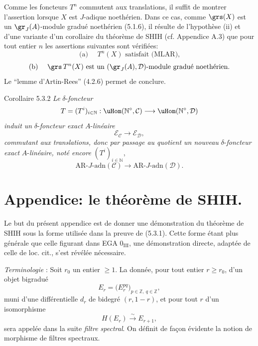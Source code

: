 \begin{prooftext}[Preuve]
Comme les foncteurs \(T^n\) commutent aux translations, il suffit de montrer l'assertion lorsque \(X\) est \(J\)-adique noethérien. Dans ce cas, comme \(\grs(X)\) est un \(\gr_J(A)\)-module gradué noethérien (5.1.6), il résulte de l'hypothèse (ii) et d'une variante d'un corollaire du théorème de SHIH (cf. Appendice A.3) que pour tout entier \(n\) les assertions suivantes sont vérifiées:
\[
\text{(a) }\quad T^n(X)\text{ satisfait (MLAR),}
\]
\[
\text{(b) }\quad \grs\,T^n(X)\text{ est un }(\gr_J(A),\mathcal{D})\text{-module gradué noethérien.}
\]
Le ``lemme d'Artin-Rees'' (4.2.6) permet de conclure.
\end{prooftext}

\begin{statement}{Corollaire 5.3.2}
\emph{Le} \(\delta\)-\emph{foncteur}
\[
T=(T^i)_{i\in\mathbb{N}}:\uHom(\mathbb{N}^\circ,\mathcal{C})\longrightarrow\uHom(\mathbb{N}^\circ,\mathcal{D})
\]
\emph{induit un} \(\delta\)-\emph{foncteur exact} \(A\)-\emph{linéaire}
\[
\mathcal{E}_{\mathcal{C}}\longrightarrow\mathcal{E}_{\mathcal{D}},
\]
\emph{commutant aux translations, donc par passage au quotient un nouveau} \(\delta\)-\emph{foncteur exact} \(A\)-\emph{linéaire, noté encore} \((T^i)_{i\in\mathbb{N}}\),
\[
\mathrm{AR}\text{-}J\text{-adn}(\mathcal{C})\longrightarrow
\mathrm{AR}\text{-}J\text{-adn}(\mathcal{D}).
\]
\end{statement}

\section*{Appendice: le théorème de SHIH.}

Le but du présent appendice est de donner une démonstration du théorème de SHIH sous la forme utilisée dans la preuve de (5.3.1). Cette forme étant plus générale que celle figurant dans EGA \(0_{\mathrm{III}}\), une démonstration directe, adaptée de celle de loc. cit., s'est révélée nécessaire.

\emph{Terminologie} : Soit \(r_0\) un entier \(\ge1\). La donnée, pour tout entier \(r\ge r_0\), d'un objet bigradué
\[
E_r=\bigl(E_r^{pq}\bigr)_{p\in\mathbb{Z},\ q\in\mathbb{Z}},
\]
muni d'une différentielle \(d_r\) de bidegré \((r,1-r)\), et pour tout \(r\) d'un isomorphisme
\[
H(E_r)\xrightarrow{\sim}E_{r+1},
\]
sera appelée dans la suite \emph{filtre spectral}. On définit de façon évidente la notion de morphisme de filtres spectraux.

